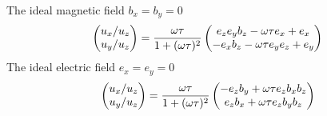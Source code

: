 \documentclass[12pt]{article} %
\newcommand{\Mypm}{\mathbin{\tikz [x=1.4ex,y=1.4ex,line width=.3ex] \draw (0.0,0) -- (1.0,0) (0.5,0.08) -- (0.5,0.92) (0.0,0.5) -- (1.0,0.5);}}%
\begin{document}
The ideal magnetic field $b_{x} = b_{y} = 0 $
\begin{equation}
\begin{pmatrix}
{u_{x}}/{u_{z}} \cr
{u_{y}}/{u_{z}} \cr
\end{pmatrix}
=
\frac{\omega \tau }{1 + (\omega \tau )^2}
\begin{pmatrix}
  e_{z} e_{y} b_{z} - \omega \tau  e_{x}        + e_{x} \cr
- e_{x} b_{z}       - \omega \tau  e_{y} e_{z}  + e_{y} \cr 
\end{pmatrix}
\end{equation}
The ideal electric field $e_{x} = e_{y} = 0 $
\begin{equation}
\begin{pmatrix}
{u_{x}}/{u_{z}} \cr
{u_{y}}/{u_{z}} \cr
\end{pmatrix}
=
\frac{\omega \tau }{1 + (\omega \tau )^2}
\begin{pmatrix}
 - e_{z} b_{y} + \omega \tau e_{z} b_{x} b_{z} \cr
   e_{z} b_{x} + \omega \tau e_{z} b_{y} b_{z} \cr 
\end{pmatrix}
\end{equation}
\end{document}
